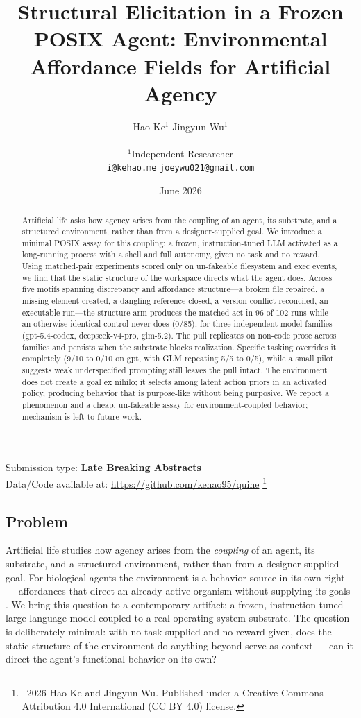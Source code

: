 \documentclass[letterpaper]{article}
\title{Structural Elicitation in a Frozen POSIX Agent: Environmental
Affordance Fields for Artificial Agency}
\author{Hao Ke$^{1}$ \quad Jingyun Wu$^{1}$ \\
\mbox{}\\
$^1$Independent Researcher \\
\texttt{i@kehao.me} \quad \texttt{joeywu021@gmail.com}}
\date{June 2026}
\newcommand\blfootnote[1]{%
  \begingroup
  \renewcommand\thefootnote{}\footnote{#1}%
  \addtocounter{footnote}{-1}%
  \endgroup
}
\begin{document}
\maketitle
\begin{abstract}
Artificial life asks how agency arises from the coupling of an agent,
its substrate, and a structured environment, rather than from a
designer-supplied goal. We introduce a minimal POSIX assay for this
coupling: a frozen, instruction-tuned LLM activated as a long-running
process with a shell and full autonomy, given no task and no reward.
Using matched-pair experiments scored only on un-fakeable filesystem and
exec events, we find that the static structure of the workspace directs
what the agent does. Across five motifs spanning discrepancy and
affordance structure---a broken file repaired, a missing element
created, a dangling reference closed, a version conflict reconciled, an
executable run---the structure arm produces the matched act in 96 of 102
runs while an otherwise-identical control never does (0/85), for three
independent model families (gpt-5.4-codex, deepseek-v4-pro, glm-5.2).
The pull replicates on non-code prose across families and persists when
the substrate blocks realization. Specific tasking overrides it
completely (9/10 to 0/10 on gpt, with GLM repeating 5/5 to 0/5), while a
small pilot suggests weak underspecified prompting still leaves the pull
intact. The environment does not create a goal ex nihilo; it selects
among latent action priors in an activated policy, producing behavior
that is purpose-like without being purposive. We report a phenomenon and
a cheap, un-fakeable assay for environment-coupled behavior; mechanism
is left to future work.
\end{abstract}

Submission type: \textbf{Late Breaking Abstracts}\\
Data/Code available at: \url{https://github.com/kehao95/quine}
\blfootnote{\textcopyright\ 2026 Hao Ke and Jingyun
Wu. Published under a Creative Commons Attribution 4.0 International (CC BY 4.0) license.}

\subsection{Problem}\label{problem}

Artificial life studies how agency arises from the \emph{coupling} of an
agent, its substrate, and a structured environment, rather than from a
designer-supplied goal. For biological agents the environment is a
behavior source in its own right --- affordances that direct an
already-active organism without supplying its goals
\citep{Gibson1979, Rietveld2014, Barker1968}. We bring this question to
a contemporary artifact: a frozen, instruction-tuned large language
model coupled to a real operating-system substrate. The question is
deliberately minimal: with no task supplied and no reward given, does
the static structure of the environment do anything beyond serve as
context --- can it direct the agent's functional behavior on its own?
\end{document}
